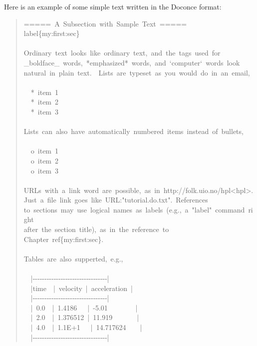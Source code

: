 \documentclass[a4paper,english]{article}
\begin{document}
Here is an example of some simple text written in the Doconce format:
%
\begin{quote}{\ttfamily \raggedright \noindent
=====~A~Subsection~with~Sample~Text~=====\\
label\{my:first:sec\}\\
~\\
Ordinary~text~looks~like~ordinary~text,~and~the~tags~used~for\\
\_boldface\_~words,~*emphasized*~words,~and~`computer`~words~look\\
natural~in~plain~text.~~Lists~are~typeset~as~you~would~do~in~an~email,\\
~\\
~~*~item~1\\
~~*~item~2\\
~~*~item~3\\
~\\
Lists~can~also~have~automatically~numbered~items~instead~of~bullets,\\
~\\
~~o~item~1\\
~~o~item~2\\
~~o~item~3\\
~\\
URLs~with~a~link~word~are~possible,~as~in~http://folk.uio.no/hpl<hpl>.\\
Just~a~file~link~goes~like~URL:"tutorial.do.txt".~References\\
to~sections~may~use~logical~names~as~labels~(e.g.,~a~"label"~command~right\\
after~the~section~title),~as~in~the~reference~to\\
Chapter~ref\{my:first:sec\}.\\
~\\
Tables~are~also~supperted,~e.g.,\\
~\\
~~|-{}-{}-{}-{}-{}-{}-{}-{}-{}-{}-{}-{}-{}-{}-{}-{}-{}-{}-{}-{}-{}-{}-{}-{}-{}-{}-{}-{}-{}-{}-{}-|\\
~~|time~~|~velocity~|~acceleration~|\\
~~|-{}-{}-{}-{}-{}-{}-{}-{}-{}-{}-{}-{}-{}-{}-{}-{}-{}-{}-{}-{}-{}-{}-{}-{}-{}-{}-{}-{}-{}-{}-{}-|\\
~~|~0.0~~|~1.4186~~~|~-5.01~~~~~~~~|\\
~~|~2.0~~|~1.376512~|~11.919~~~~~~~|\\
~~|~4.0~~|~1.1E+1~~~|~14.717624~~~~|\\
~~|-{}-{}-{}-{}-{}-{}-{}-{}-{}-{}-{}-{}-{}-{}-{}-{}-{}-{}-{}-{}-{}-{}-{}-{}-{}-{}-{}-{}-{}-{}-{}-|
}
\end{quote}
\end{document}
